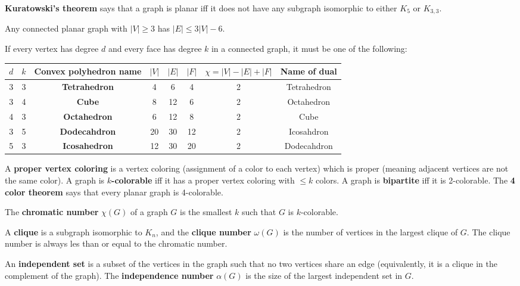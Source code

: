 \documentclass[10pt]{article}
\begin{document}
\par
\textbf{Kuratowski's theorem} says that a graph is planar iff it does not have any subgraph isomorphic to either $K_5$ or $K_{3,3}$.
\par
Any connected planar graph with $|V|\geq3$ has $|E|\leq 3|V|-6$.
\par
If every vertex has degree $d$ and every face has degree $k$ in a connected graph, it must be one of the following:
\begin{center}
\begin{tabular}{ |c c | c | c c c | c | c|}
    \hline
    $d$ &  $k$ & \textbf{Convex polyhedron name} & $|V|$ & $|E|$ & $|F|$ & $\chi=|V|-|E|+|F|$ & Name of dual \\ 
    \hline
    \hline
    3 & 3 & \textbf{Tetrahedron} & 4 & 6 & 4 & 2 & Tetrahedron \\
    \hline
    3 & 4 & \textbf{Cube} & 8 & 12 & 6 & 2 & Octahedron \\
    4 & 3 & \textbf{Octahedron} & 6 & 12 & 8 & 2 & Cube \\
    \hline
    3 & 5 & \textbf{Dodecahdron} & 20 & 30 & 12 & 2 & Icosahdron \\
    5 & 3 & \textbf{Icosahedron} & 12 & 30 & 20 & 2 & Dodecahdron \\
    \hline
\end{tabular}
\end{center}
\par
A \textbf{proper vertex coloring} is a vertex coloring (assignment of a color to each vertex) which is proper (meaning adjacent vertices are not the same color). A graph is \textbf{$k$-colorable} iff it has a proper vertex coloring with $\leq k$ colors. A graph is \textbf{bipartite} iff it is 2-colorable. The \textbf{4 color theorem} says that every planar graph is 4-colorable.
\par
The \textbf{chromatic number} $\chi(G)$ of a graph $G$ is the smallest $k$ such that $G$ is $k$-colorable.
\par
A \textbf{clique} is a subgraph isomorphic to $K_n$, and the \textbf{clique number} $\omega(G)$ is the number of vertices in the largest clique of $G$. The clique number is always les than or equal to the chromatic number.
\par
An \textbf{independent set} is a subset of the vertices in the graph such that no two vertices share an edge (equivalently, it is a clique in the complement of the graph). The \textbf{independence number} $\alpha(G)$ is the size of the largest independent set in $G$.
\par
\end{document}
